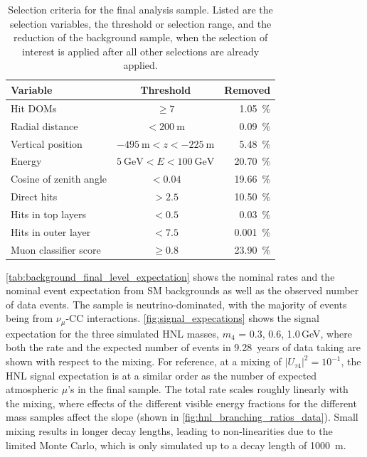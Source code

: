\documentclass[
    aps,
    prd,
    reprint,
    amsmath,
    amssymb,
    nofootinbib,
    superscriptaddress,
    floatfix
]{revtex4-2}
\newcommand{\gev}{\giga\electronvolt}
\def\nomathut4{|U_{\tau4}|^2}
\begin{document}
\begin{table}[h]
    \footnotesize
        \begin{tabular}{ lcr }
        \hline\hline    
        \textbf{Variable} & \textbf{Threshold} & \textbf{Removed} \\
        \hline\hline    
        Hit DOMs & $\geq 7$ & \SI{1.05}{\percent} \\
        Radial distance & $< \SI{200}{\meter}$ & \SI{0.09}{\percent} \\
        Vertical position & $\SI{-495}{\meter} < z < \SI{-225}{\meter}$ & \SI{5.48}{\percent} \\
        Energy & $\SI{5}{\gev} < E < \SI{100}{\gev}$ & \SI{20.70}{\percent} \\    
        Cosine of zenith angle & $< 0.04$ & \SI{19.66}{\percent} \\
        Direct hits & $> 2.5$ & \SI{10.50}{\percent} \\
        Hits in top layers & $< 0.5$ & \SI{0.03}{\percent} \\
        Hits in outer layer & $< 7.5$ & \SI{0.001}{\percent} \\
        Muon classifier score & $\geq 0.8$ & \SI{23.90}{\percent} \\
        \hline
        \end{tabular}
    \caption{Selection criteria for the final analysis sample. Listed are the selection variables, the threshold or selection range, and the reduction of the background sample, when the selection of interest is applied after all other selections are already applied.}
    \label{tab:analysis_cuts}
\end{table}

\cref{tab:background_final_level_expectation} shows the nominal rates and the nominal event expectation from SM backgrounds as well as the observed number of data events. The sample is neutrino-dominated, with the majority of events being from $\nu_\mu$-CC interactions. \cref{fig:signal_expecations} shows the signal expectation for the three simulated HNL masses, $m_4$ = {0.3, 0.6, 1.0}\,GeV, where both the rate and the expected number of events in \SI{9.28}{years} of data taking are shown with respect to the mixing. For reference, at a mixing of $\nomathut4=10^{-1}$, the HNL signal expectation is at a similar order as the number of expected atmospheric $\mu$'s in the final sample. The total rate scales roughly linearly with the mixing, where effects of the different visible energy fractions for the different mass samples affect the slope (shown in \cref{fig:hnl_branching_ratios_data}). Small mixing results in longer decay lengths, leading to non-linearities due to the limited Monte Carlo, which is only simulated up to a decay length of \SI{1000}{\meter}.
\end{document}
